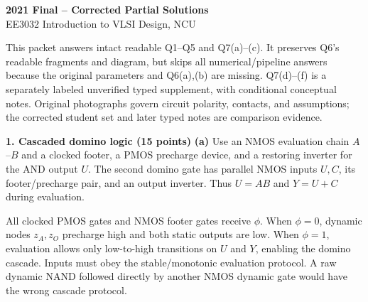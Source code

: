 \documentclass[10pt]{article}
\newcommand{\mos}[4]{\begin{scope}[shift={(#1,#2)}]
\draw (0,.24)--(0,-.24);\draw (0,.20)--(.25,.20)--(.25,.5);
\draw (0,-.20)--(.25,-.20)--(.25,-.5);\draw (-.16,.23)--(-.16,-.23);
\ifnum#4=1\draw (-.26,0) circle (.06);\draw (-.75,0)--(-.32,0);\else\draw (-.75,0)--(-.16,0);\fi
\node[anchor=east,font=\scriptsize] at (-.76,0) {$#3$};\end{scope}}
\newcommand{\ground}[2]{\draw (#1,#2)--(#1,{#2-.12});\draw ({#1-.17},{#2-.12})--({#1+.17},{#2-.12});\draw ({#1-.11},{#2-.20})--({#1+.11},{#2-.20});}
\newcommand{\rail}[3]{\draw (#1,#2)--(#1,{#2+.14});\node[above,font=\scriptsize] at (#1,{#2+.14}) {$#3$};}
\begin{document}
\begin{center}{\Large\bfseries 2021 Final -- Corrected Partial Solutions}\\EE3032 Introduction to VLSI Design, NCU\end{center}
This packet answers intact readable Q1--Q5 and Q7(a)--(c). It preserves Q6's readable fragments and diagram, but skips all numerical/pipeline answers because the original parameters and Q6(a),(b) are missing. Q7(d)--(f) is a separately labeled unverified typed supplement, with conditional conceptual notes. Original photographs govern circuit polarity, contacts, and assumptions; the corrected student set and later typed notes are comparison evidence.

\textbf{1. Cascaded domino logic (15 points)}
\textbf{(a)} Use an NMOS evaluation chain $A$--$B$ and a clocked footer, a PMOS precharge device, and a restoring inverter for the AND output $U$. The second domino gate has parallel NMOS inputs $U,C$, its footer/precharge pair, and an output inverter. Thus $U=AB$ and $Y=U+C$ during evaluation.
\begin{center}\end{center}
All clocked PMOS gates and NMOS footer gates receive $\phi$. When $\phi=0$, dynamic nodes $z_A,z_O$ precharge high and both static outputs are low. When $\phi=1$, evaluation allows only low-to-high transitions on $U$ and $Y$, enabling the domino cascade. Inputs must obey the stable/monotonic evaluation protocol. A raw dynamic NAND followed directly by another NMOS dynamic gate would have the wrong cascade protocol.
\end{document}
